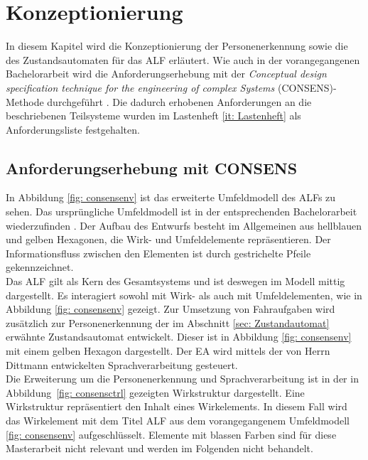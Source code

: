\chapter{Konzeptionierung}
\label{ch: Konzeptionierung}

In diesem Kapitel wird die Konzeptionierung der Personenerkennung sowie die des Zustandsautomaten für das ALF erläutert. Wie auch in der vorangegangenen Bachelorarbeit wird die Anforderungserhebung mit der \textit{Conceptual design specification technique for the engineering of complex Systems} (CONSENS)-Methode durchgeführt \cite{Bachelorarbeit}. Die dadurch erhobenen Anforderungen an die beschriebenen Teilsysteme wurden im Lastenheft \ref{it: Lastenheft} als Anforderungsliste festgehalten.
	
	
	\section{Anforderungserhebung mit CONSENS}
	\label{sec: Anforderungserhebung}
	
	In Abbildung \ref{fig: consensenv} ist das erweiterte Umfeldmodell des ALFs zu sehen. Das ursprüngliche Umfeldmodell ist in der entsprechenden Bachelorarbeit wiederzufinden \cite{Bachelorarbeit}. Der Aufbau des Entwurfs besteht im Allgemeinen aus hellblauen und gelben Hexagonen, die Wirk- und Umfeldelemente repräsentieren. Der Informationsfluss zwischen den Elementen ist durch gestrichelte Pfeile gekennzeichnet.\\
	
	Das ALF gilt als Kern des Gesamtsystems und ist deswegen im Modell mittig dargestellt. Es interagiert sowohl mit Wirk- als auch mit Umfeldelementen, wie in Abbildung \ref{fig: consensenv} gezeigt. Zur Umsetzung von Fahraufgaben wird zusätzlich zur Personenerkennung der im Abschnitt \ref{sec: Zustandautomat} erwähnte Zustandsautomat entwickelt. Dieser ist in Abbildung \ref{fig: consensenv} mit einem gelben Hexagon dargestellt. Der EA wird mittels der von Herrn Dittmann entwickelten Sprachverarbeitung gesteuert.\\
	
		
	
	Die Erweiterung um die Personenerkennung und Sprachverarbeitung ist in der in Abbildung~\ref{fig: consensctrl} gezeigten Wirkstruktur dargestellt. Eine Wirkstruktur repräsentiert den Inhalt eines Wirkelements. In diesem Fall wird das Wirkelement mit dem Titel ALF aus dem vorangegangenem Umfeldmodell \ref{fig: consensenv} aufgeschlüsselt. Elemente mit blassen Farben sind für diese Masterarbeit nicht relevant und werden im Folgenden nicht behandelt.\\
	
